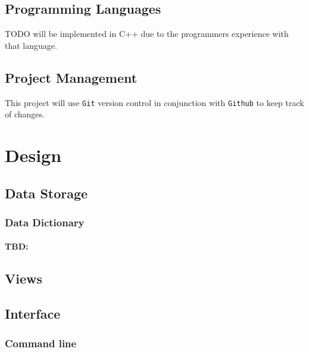 \documentclass[12pt,a4paper]{article}
\begin{document}
\subsection{Programming Languages}
TODO will be implemented in C++ due to the programmers experience with that language.

\subsection{Project Management}
This project will use {\tt Git} version control in conjunction with {\tt Github} to keep track of changes.

\section{Design}
\subsection{Data Storage}\label{sec:Data Storage}
\subsubsection{}

\subsubsection{Data Dictionary}\label{sec:}
\paragraph{TBD:} 

\subsection{Views}
\subsubsection{}

\subsubsection{}

\subsection{Interface}
\subsubsection{Command line}
\end{document}
